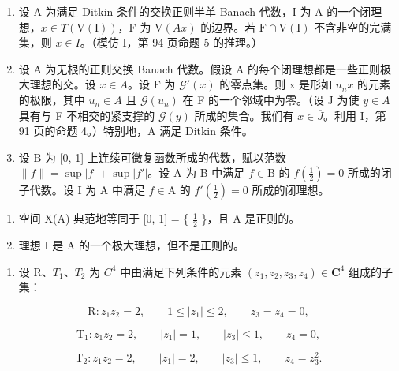\begin{enumerate}
\def\labelenumi{\arabic{enumi})}
\setcounter{enumi}{3}
\item
  设 A 为满足 Ditkin 条件的交换正则半单 Banach 代数，I 为 A 的一个闭理想，\(x \in \Upsilon(\mathrm{V}(\mathrm{I}))\)，F 为 \(\mathrm{V}(Ax)\) 的边界。若 \(\mathrm{F} \cap \mathrm{V}(\mathrm{I})\) 不含非空的完满集，则 \(x \in I\)。（模仿 I，第 94 页命题 5 的推理。）
\item
  设 A 为无根的正则交换 Banach 代数。假设 A 的每个闭理想都是一些正则极大理想的交。设 \(x \in A\)。设 F 为 \(\mathcal{G}'(x)\) 的零点集。则 x 是形如 \(u_{n}x\) 的元素的极限，其中 \(u_{n} \in A\) 且 \(\mathcal{G}(u_{n})\) 在 F 的一个邻域中为零。（设 J 为使 \(y \in A\) 具有与 F 不相交的紧支撑的 \(\mathcal{G}(y)\) 所成的集合。我们有 \(x \in \overline{J}\)。利用 I，第 91 页的命题 4。）特别地，A 满足 Ditkin 条件。
\item
  设 B 为 {[}0, 1{]} 上连续可微复函数所成的代数，赋以范数 \(\|f\| = \sup |f| + \sup |f'|\)。设 A 为 B 中满足 \(f \in \mathrm{B}\) 的 \(f\left(\frac{1}{2}\right) = 0\) 所成的闭子代数。设 I 为 A 中满足 \(f \in \mathrm{A}\) 的 \(f'\left(\frac{1}{2}\right) = 0\) 所成的闭理想。
\end{enumerate}

\begin{enumerate}
\def\labelenumi{\alph{enumi})}
\item
  空间 X(A) 典范地等同于 {[}0, 1{]} = \{ \(\frac{1}{2}\) \}，且 A 是正则的。
\item
  理想 I 是 A 的一个极大理想，但不是正则的。
\end{enumerate}

\begin{enumerate}
\def\labelenumi{\arabic{enumi})}
\setcounter{enumi}{6}
\tightlist
\item
  设 R、\(T_{1}\)、\(T_{2}\) 为 \(C^{4}\) 中由满足下列条件的元素 \((z_{1}, z_{2}, z_{3}, z_{4}) \in \mathbf{C}^{4}\) 组成的子集：
\end{enumerate}

\[
\mathrm{R} \colon z _ {1} z _ {2} = 2, \qquad 1 \leqslant | z _ {1} | \leqslant 2, \qquad z _ {3} = z _ {4} = 0,
\]

\[
\mathrm{T} _ {1} \colon z _ {1} z _ {2} = 2, \qquad | z _ {1} | = 1, \qquad | z _ {3} | \leqslant 1, \qquad z _ {4} = 0,
\]

\[
\mathrm{T} _ {2} \colon z _ {1} z _ {2} = 2, \qquad | z _ {1} | = 2, \qquad | z _ {3} | \leqslant 1, \qquad z _ {4} = z _ {3} ^ {2}.
\]

